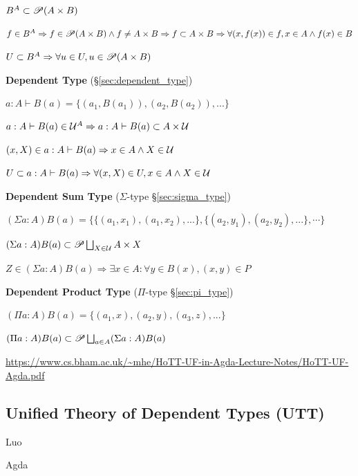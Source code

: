 $B^A \subset \mathscr{P}(A \times B)$

$f \in B^A
\Rightarrow f \in \mathscr{P}(A \times B) \wedge f \neq A \times B \allowbreak
\Rightarrow f \subset A \times B
\Rightarrow \forall (x, f(x)) \in f, x \in A \wedge f(x) \in B$

$U \subset B^A \Rightarrow \forall u \in U, u \in \mathscr{P}(A \times B)$


\textbf{Dependent Type} (\S\ref{sec:dependent_type})

$a:A \vdash B(a) = \{(a_1,B(a_1)), (a_2,B(a_2)), ...\}$

$a:A \vdash B(a) \in \class{U}^A \linebreak[1]
\Rightarrow a:A \vdash B(a) \subset A \times \class{U}$

$(x,X) \in a:A \vdash B(a) \Rightarrow x \in A \wedge X \in \mathcal{U}$

$U \subset a:A \vdash B(a) \Rightarrow \forall (x,X) \in U, x \in A
\wedge X \in \mathcal{U}$


\textbf{Dependent Sum Type} ($\Sigma$-type \S\ref{sec:sigma_type})

$(\Sigma a:A) B(a) = \{\{ (a_1, x_1), (a_1, x_2), ...\},
\{ (a_2, y_1), (a_2, y_2), ...\}, \cdots \}$

$(\Sigma a:A) B(a) \subset \mathscr{P} \bigsqcup_{X \in \mathcal{U}} A \times X$

$Z \in (\Sigma a:A) B(a) \Rightarrow \exists x \in A : \forall y \in
B(x), (x,y) \in P$



\textbf{Dependent Product Type} ($\Pi$-type \S\ref{sec:pi_type})

$(\Pi a:A) B(a) = \{(a_1, x), (a_2, y), (a_3, z), ...\}$

$(\Pi a:A) B(a) \subset \mathscr{P} \bigsqcup_{a \in A} (\Sigma a:A) B(a)$


\asterism

\url{https://www.cs.bham.ac.uk/~mhe/HoTT-UF-in-Agda-Lecture-Notes/HoTT-UF-Agda.pdf}



\subsection{Unified Theory of Dependent Types (UTT)}\label{sec:utt}

Luo

Agda



